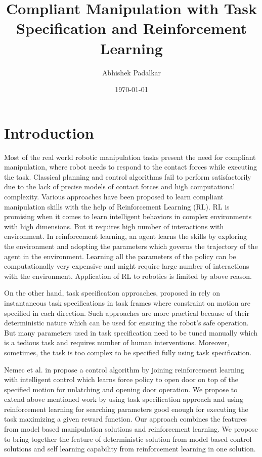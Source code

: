 \documentclass[thesis]{mas_proposal}
\title{Compliant Manipulation with Task Specification and Reinforcement Learning}
\author{Abhishek Padalkar}
\date{\today}
\begin{document}
\maketitle

\pagestyle{plain}

\chapter{Introduction}
Most of the real world robotic manipulation tasks present the need for compliant manipulation, where robot needs to respond to the contact forces while executing the task. Classical planning and control algorithms fail to perform satisfactorily due to the lack of precise models of contact forces and high computational complexity. Various approaches have been proposed to learn compliant manipulation skills with the help of Reinforcement Learning (RL). RL is promising when it comes to learn intelligent behaviors in complex environments with high dimensions. But it requires high number of interactions with environment. In reinforcement learning, an agent learns the skills by exploring the environment and adopting the parameters which governs the trajectory of the agent in the environment. Learning all the parameters of the policy can be computationally very expensive and might require large number of interactions with the environment. Application of RL to robotics is limited by above reason. 

On the other hand, task specification approaches, proposed in \cite{leidner2017cognitive,mason1981compliance,bruyninckx1996specification} rely on instantaneous task specifications in task frames where constraint on motion are specified in each direction. Such approaches are more practical because of their deterministic nature which can be used for ensuring the robot's safe operation. But many parameters used in task specification need to be tuned manually which is a tedious task and requires number of human interventions. Moreover, sometimes, the task is too complex to be specified fully using task specification. 

Nemec et al. in \cite{nemec2017door} propose a control algorithm by joining reinforcement learning with intelligent control which learns force policy to open door on top of the specified motion for unlatching and opening door operation. We propose to extend above mentioned work by using task specification approach and using reinforcement learning for searching parameters good enough for executing the task maximizing a given reward function. Our approach combines the features from model based manipulation solutions and reinforcement learning. We propose to bring together the feature of deterministic solution from model based control solutions and self learning capability from reinforcement learning in one solution.  
\end{document}

